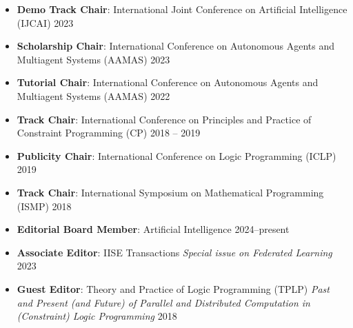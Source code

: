   \begin{itemize}

    \item {\bf Demo Track Chair}: 
    International Joint Conference on Artificial Intelligence (IJCAI)
    \hfill{2023}

    \item {\bf Scholarship Chair}: 
    International Conference on Autonomous Agents and Multiagent Systems (AAMAS)
    \hfill{2023}

    \item {\bf Tutorial Chair}: 
    International Conference on Autonomous Agents and Multiagent Systems (AAMAS)
    \hfill{2022}
    
  \item {\bf Track Chair}: 
  {International Conference on Principles and Practice of Constraint Programming (CP)}
    \hfill{2018 -- 2019}

  \item {\bf Publicity Chair}: {International Conference on Logic Programming (ICLP)}
  \hfill{2019}

  \item {\bf Track Chair}: {International Symposium on Mathematical Programming (ISMP)}
  \hfill{2018}
 
  \end{itemize}

  \begin{itemize}
    \item {\bf Editorial Board Member}: Artificial Intelligence 
    \hfill{2024--present}

    \item {\bf Associate Editor}: IISE Transactions
    \emph{Special issue on Federated Learning} \hfill{2023}

  \item {\bf Guest Editor}: {Theory and Practice of Logic Programming (TPLP)}
  \emph{Past and Present (and Future) of Parallel and Distributed Computation in (Constraint) Logic Programming} 
  \hfill {2018}
\end{itemize}

